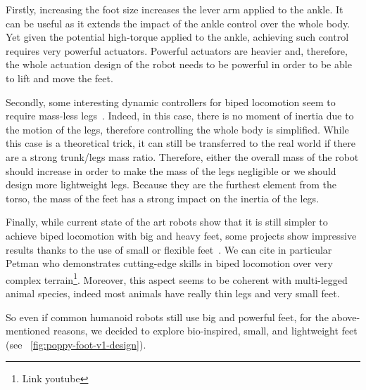 Firstly, increasing the foot size increases the lever arm applied to the ankle. It can be useful as it extends the impact of the ankle control over the whole body. Yet given the potential high-torque applied to the ankle, achieving such control requires very powerful actuators.
Powerful actuators are heavier and, therefore, the whole actuation design of the robot needs to be powerful in order to be able to lift and move the feet.

Secondly, some interesting dynamic controllers for biped locomotion seem to require mass-less legs~\parencite{hyon2002development}. Indeed, in this case, there is no moment of inertia due to the motion of the legs, therefore controlling the whole body is simplified. While this case is a theoretical trick, it can still be transferred to the real world if there are a strong trunk/legs mass ratio. Therefore, either the overall mass of the robot should increase in order to make the mass of the legs negligible or we should design more lightweight legs.
Because they are the furthest element from the torso, the mass of the feet has a strong impact on the inertia of the legs.

Finally, while current state of the art robots show that it is still simpler to achieve biped locomotion with big and heavy feet, some projects show impressive results thanks to the use of small or flexible feet~\parencite{bruneau2001dynamic}. We can cite in particular Petman who demonstrates cutting-edge skills in biped locomotion over very complex terrain\footnote{Link youtube}.
Moreover, this aspect seems to be coherent with multi-legged animal species, indeed most animals have really thin legs and very small feet.

So even if common humanoid robots still use big and powerful feet, for the above-mentioned reasons, we decided to explore bio-inspired, small, and lightweight feet (see \figurename~\ref{fig:poppy-foot-v1-design}).




